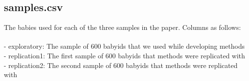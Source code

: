 \documentclass[man]{apa7}
\begin{document}
\subsection*{samples.csv}

The babies used for each of the three samples in the paper. Columns as follows: \\\\
- exploratory: The sample of 600 babyids that we used while developing methods \\
- replication1: The first sample of 600 babyids that methods were replicated with  \\
- replication2: The second sample of 600 babyids that methods were replicated with


\end{document}
